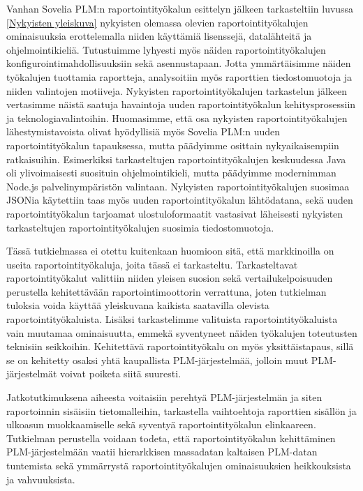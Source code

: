 Vanhan Sovelia PLM:n raportointityökalun esittelyn jälkeen tarkasteltiin luvussa \ref{Nykyisten yleiskuva} nykyisten olemassa olevien raportointityökalujen ominaisuuksia erottelemalla niiden käyttämiä lisenssejä, datalähteitä ja ohjelmointikieliä. Tutustuimme lyhyesti myös näiden raportointityökalujen konfigurointimahdollisuuksiin sekä asennustapaan. Jotta ymmärtäisimme näiden työkalujen tuottamia raportteja, analysoitiin myös raporttien tiedostomuotoja ja niiden valintojen motiiveja. Nykyisten raportointityökalujen tarkastelun jälkeen vertasimme näistä saatuja havaintoja uuden raportointityökalun kehitysprosessiin ja teknologiavalintoihin. Huomasimme, että osa nykyisten raportointityökalujen lähestymistavoista olivat hyödyllisiä myös Sovelia PLM:n uuden raportointityökalun tapauksessa, mutta päädyimme osittain nykyaikaisempiin ratkaisuihin. Esimerkiksi tarkasteltujen raportointityökalujen keskuudessa Java oli ylivoimaisesti suosituin ohjelmointikieli, mutta päädyimme modernimman Node.js palvelinympäristön valintaan. Nykyisten raportointityökalujen suosimaa JSONia käytettiin taas myös uuden raportointityökalun lähtödatana, sekä uuden raportointityökalun tarjoamat ulostuloformaatit vastasivat läheisesti nykyisten tarkasteltujen raportointityökalujen suosimia tiedostomuotoja.

Tässä tutkielmassa ei otettu kuitenkaan huomioon sitä, että markkinoilla on useita raportointityökaluja, joita tässä ei tarkasteltu. Tarkasteltavat raportointityökalut valittiin niiden yleisen suosion sekä vertailukelpoisuuden perustella kehitettävään raportointimoottorin verrattuna, joten tutkielman tuloksia voida käyttää yleiskuvana kaikista saatavilla olevista raportointityökaluista. Lisäksi tarkastelimme valituista raportointityökaluista vain muutamaa ominaisuutta, emmekä syventyneet näiden työkalujen toteutusten teknisiin seikkoihin. Kehitettävä raportointityökalu on myös yksittäistapaus, sillä se on kehitetty osaksi yhtä kaupallista PLM-järjestelmää, jolloin muut PLM-järjestelmät voivat poiketa siitä suuresti.

Jatkotutkimuksena aiheesta voitaisiin perehtyä PLM-järjestelmän ja siten raportoinnin sisäisiin tietomalleihin, tarkastella vaihtoehtoja raporttien sisällön ja ulkoasun muokkaamiselle sekä syventyä raportointityökalun elinkaareen. Tutkielman perustella voidaan todeta, että raportointityökalun kehittäminen PLM-järjestelmään vaatii hierarkkisen massadatan kaltaisen PLM-datan tuntemista sekä ymmärrystä raportointityökalujen ominaisuuksien heikkouksista ja vahvuuksista.
